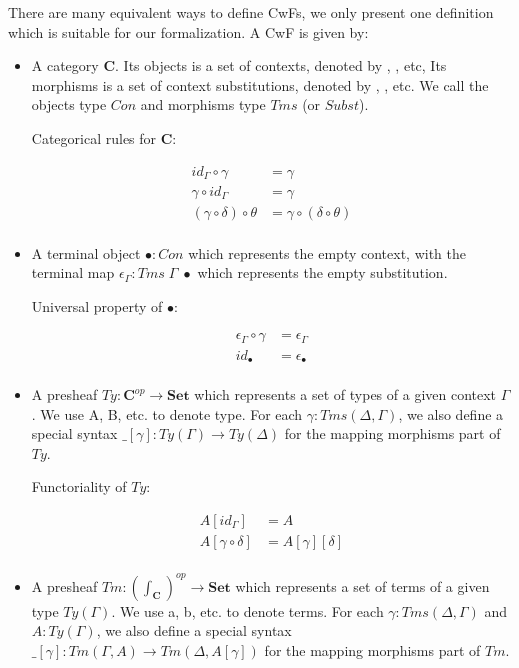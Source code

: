 {There are many equivalent ways to define CwFs, we only present one definition which is suitable for our formalization. A CwF is given by:

\begin{itemize}
  \item{A category \textbf{C}. Its objects is a set of contexts, denoted by \Gamma, \Delta, etc, Its morphisms is a set of context substitutions, denoted by \gamma, \delta, etc. We call the objects type $Con$ and morphisms type $Tms$ (or $Subst$).
  
  Categorical rules for \textbf{C}:

  \begin{align*}
    id_{\Gamma} \circ \gamma & = \gamma \\
    \gamma \circ id_{\Gamma} & = \gamma \\
    (\gamma \circ \delta) \circ \theta & = \gamma \circ (\delta \circ \theta) \\
  \end{align*}
  }

  \item{A terminal object $\bullet : Con$ which represents the empty context, with the terminal map $\epsilon_{\Gamma} : Tms\;\Gamma\;\bullet$ which represents the empty substitution. 
  
  Universal property of $\bullet$:

  \begin{align*}
    \epsilon_{\Gamma} \circ \gamma & = \epsilon_{\Gamma} \\
    id_{\bullet} & = \epsilon_{\bullet} \\
  \end{align*}
  }

  \item{A presheaf $Ty : \textbf{C}^{op} \to \textbf{Set}$ which represents a set of types of a given context $\Gamma$. We use A, B, etc. to denote type. For each $\gamma : Tms (\Delta, \Gamma)$, we also define a special syntax $\_[\gamma] : Ty(\Gamma) \to Ty(\Delta)$ for the mapping morphisms part of $Ty$.

  Functoriality of $Ty$:

  \begin{align*}
    A [id_{\Gamma}] & = A \\
    A [\gamma \circ \delta] & = A [\gamma] [\delta] \\
  \end{align*}
  }

  \item{A presheaf 
  $Tm : (\int_{\textbf{C}})^{op} \to \textbf{Set}$ 
  which represents a set of terms of a given type $Ty(\Gamma)$. We use a, b, etc. to denote terms. For each $\gamma : Tms (\Delta, \Gamma)$ and $A : Ty(\Gamma)$, we also define a special syntax $\_[\gamma] : Tm(\Gamma, A) \to Tm(\Delta, A [\gamma])$ for the mapping morphisms part of $Tm$.

}
\end{itemize}}
